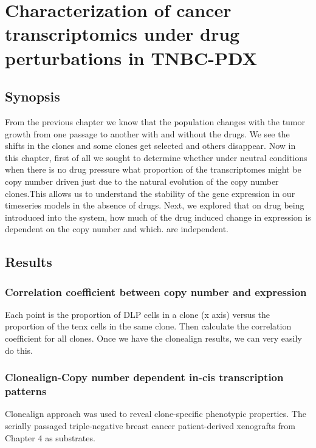 {\chapter{Characterization of cancer transcriptomics under drug perturbations in TNBC-PDX}

}
\label{ch:Chapter5}
\section{Synopsis}
From the previous chapter we know that the population changes with the tumor growth from one passage to another with and without the drugs. We see the shifts in the clones and some clones get selected and others disappear.
Now in this chapter, first of all we sought to determine whether under neutral conditions when there is no drug pressure what proportion of the transcriptomes might be copy number driven just due to the natural evolution of the copy number clones.This allows us to understand the stability of the gene expression in our timeseries models in the absence of drugs.
Next, we explored that on drug being introduced into the system, how much of the drug induced change in expression is dependent on the copy number and which. are independent.







\section{Results}
\subsection{Correlation coefficient between copy number and expression}

Each point is the proportion of DLP cells in a clone (x axis) versus the proportion of the tenx cells in the same clone. Then calculate the correlation coefficient for all clones. Once we have the clonealign results, we can very easily do this.

\subsection{Clonealign-Copy number dependent in-cis transcription patterns}
Clonealign approach was used to reveal clone-specific phenotypic properties. The serially passaged triple-negative breast cancer patient-derived xenografts from Chapter 4 as substrates.

